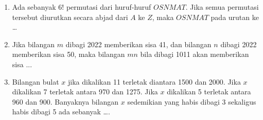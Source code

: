 \documentclass[11pt]{scrartcl}
\begin{document}
\begin{enumerate}
    \item Ada sebanyak $6!$ permutasi dari huruf-huruf $OSNMAT$. Jika semua permutasi tersebut diurutkan secara abjad dari $A$ ke $Z$, maka $OSNMAT$ pada urutan ke \dots

    \item Jika bilangan $m$ dibagi 2022 memberikan sisa 41, dan bilangan $n$ dibagi 2022 memberikan sisa 50, maka bilangan $mn$  bila dibagi 1011 akan memberikan sisa ...

    \item Bilangan bulat $x$ jika dikalikan 11 terletak diantara 1500 dan 2000. Jika $x$ dikalikan 7 terletak antara 970 dan 1275. Jika $x$ dikalikan 5 terletak antara 960 dan 900. Banyaknya bilangan $x$ sedemikian yang habis dibagi 3 sekaligus habis dibagi 5 ada sebanyak ….
\end{enumerate}
\end{document}
